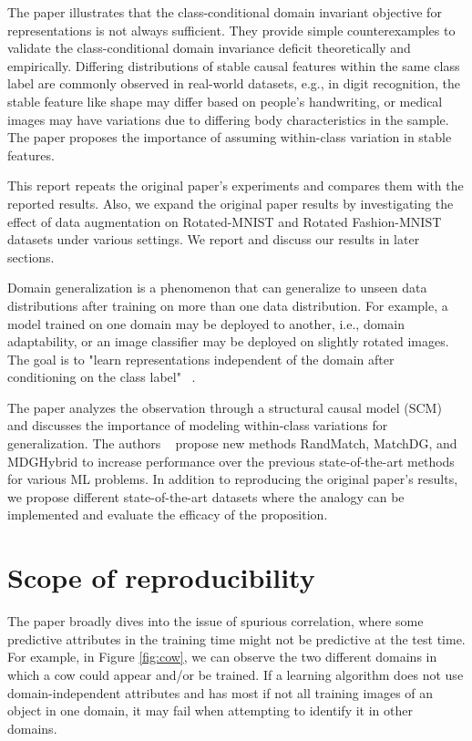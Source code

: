 The paper illustrates that the class-conditional domain invariant objective for representations is not always sufficient. They provide simple counterexamples to validate the class-conditional domain invariance deficit theoretically and empirically. Differing distributions of stable causal features within the same class label are commonly observed in real-world datasets, e.g., in digit recognition, the stable feature like shape may differ based on people’s handwriting, or medical images may have variations due to differing body characteristics in the sample. The paper proposes the importance of assuming within-class variation in stable features.

This report repeats the original paper's experiments and compares them with the reported results. Also, we expand the original paper results by investigating the effect of data augmentation on Rotated-MNIST and Rotated Fashion-MNIST datasets under various settings. We report and discuss our results in later sections.

Domain generalization is a phenomenon that can generalize to unseen data distributions after training on more than one data distribution. For example, a model trained on one domain may be deployed to another, i.e., domain adaptability, or an image classifier may be deployed on slightly rotated images. The goal is to "learn representations independent of the domain after conditioning on the class label" ~\cite{domaingen2021}. 

The paper analyzes the observation through a structural causal model (SCM) and discusses the importance of modeling within-class variations for generalization. The authors ~\cite{domaingen2021} propose new methods RandMatch, MatchDG, and MDGHybrid to increase performance over the previous state-of-the-art methods for various ML problems. In addition to reproducing the original paper's results, we propose different state-of-the-art datasets where the analogy can be implemented and evaluate the efficacy of the proposition. 

\section{Scope of reproducibility}
\label{sec:claims}
The paper broadly dives into the issue of spurious correlation, where some predictive attributes in the training time might not be predictive at the test time. For example, in Figure \ref{fig:cow}, we can observe the two different domains in which a cow could appear and/or be trained. If a learning algorithm does not use domain-independent attributes and has most if not all training images of an object in one domain, it may fail when attempting to identify it in other domains. 

